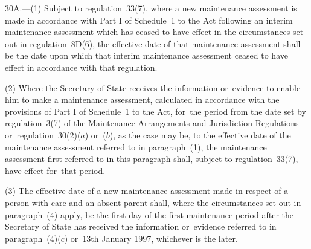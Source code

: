 \documentclass[a4paper,12pt]{article}
\begin{document}
30A.—(1) Subject to regulation~33(7), where a new maintenance assessment is made in accordance with Part I of Schedule~1 to the Act following an interim maintenance assessment which has ceased to have effect in the circumstances set out in regulation~8D(6), the effective date of that maintenance assessment shall be the date upon which that interim maintenance assessment ceased to have effect in accordance with that regulation.


(2) Where 
the Secretary of State  %
receives the information or~evidence to enable him to make a maintenance assessment, calculated in accordance with the provisions of Part I of Schedule~1 to the Act, for~the period from the date set by regulation~3(7) of the Maintenance Arrangements and Jurisdiction Regulations or~regulation~30(2)($a$) or~($b$), as the case may be, to the effective date of the maintenance assessment referred to in paragraph~(1), the maintenance assessment first referred to in this paragraph shall, subject to regulation~33(7), have effect for~that period.

(3) The effective date of a new maintenance assessment made in respect of a person with care and an absent parent shall, where the circumstances set out in paragraph~(4) apply, be the first day of the first maintenance period after the 
Secretary of State  %
has received the information or~evidence referred to in paragraph~(4)($c$) or~13th January 1997, whichever is the later.
\end{document}
